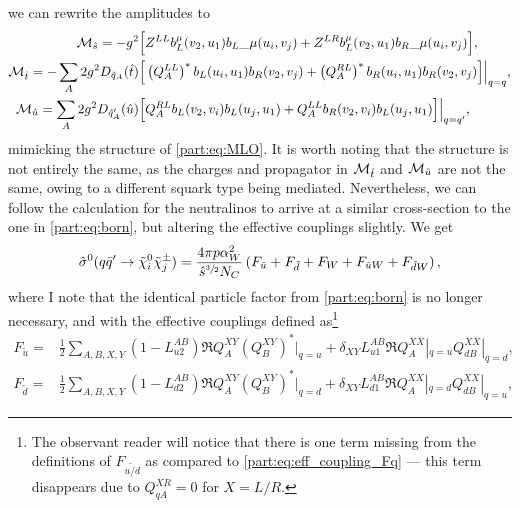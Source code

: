 \documentclass[../main.tex]{subfiles}
\begin{document}
we can rewrite the amplitudes to
\begin{subequations}
  \begin{align}
    \mathcal{M}_{\hat{s}} = -g^2 \Big[                                        &
      Z^{LL} b_L^\mu(v_2, u_1){b_L}\_{\mu}(u_i, v_j) + Z^{LR} b_L^\mu{(v_2, u_1)b_R}\_{\mu}(u_i, v_j)
    \Big],                                                             \\
    \mathcal{M}_{\hat{t}} = -\sum_A 2g^2 D_{\tilde{q}_A}(\hat{t}) \Big[       &
      \left(Q_{A}^{LL}\right)^\ast b_L(u_i, u_1) b_R(v_2, v_j) + \left(Q_{A}^{RL}\right)^\ast b_R(u_i, u_1) b_R(v_2, v_j)
    \Big] \Big|_{q=q},                                                 \\
    \mathcal{M}_{\hat{u}} = \sum_A 2g^2 D_{\tilde{q}^\prime_A}(\hat{u}) \Big[ &
      Q_{A}^{RL} b_L(v_2, v_i) b_L(u_j, u_1) + Q_{A}^{LL} b_R(v_2, v_i) b_L(u_j, u_1)
      \Big] \Big|_{q=q^\prime},
  \end{align}
\end{subequations}
mimicking the structure of \cref{part:eq:MLO}.
It is worth noting that the structure is not entirely the same, as the charges and propagator in \(\mathcal{M}_{\hat{t}}\) and \(\mathcal{M}_{\hat{u}}\) are not the same, owing to a different squark type being mediated.
Nevertheless, we can follow the calculation for the neutralinos to arrive at a similar cross-section to the one in \cref{part:eq:born}, but altering the effective couplings slightly.
We get
\begin{equation}
  \hat\sigma^0(q\bar{q}^\prime \to \tilde\chi^0_i \tilde\chi^\pm_j) = \frac{4 \pi p \alpha_W^2}{\hat{s}^{\sfrac{3}{2}} N_C} \left(F_{\tilde{u}} + F_{\tilde{d}} + F_W + F_{\tilde{u}W} + F_{\tilde{d}W}\right),
\end{equation}
where I note that the identical particle factor from \cref{part:eq:born} is no longer necessary, and with the effective couplings defined as\footnote{The observant reader will notice that there is one term missing from the definitions of \(F_{\tilde{u/d}}\) as compared to \cref{part:eq:eff_coupling_Fq} --- this term disappears due to \(Q_{qA}^{XR} = 0\) for \(X = L/R\).}
\\
\begin{subequations}
  \begin{align}
    F_{\tilde{u}} = & \frac{1}{2} \sum_{A,B,X,Y} (1 - L_{u2}^{AB}) \Re{Q_{A}^{XY} (Q_{B}^{XY})^\ast}\Big|_{q=u} + \delta_{XY} L_{u1}^{AB} \Re{Q_{A}^{XX}|_{q=u} Q_{dB}^{XX}|_{q=d}}, \\
    F_{\tilde{d}} = & \frac{1}{2} \sum_{A,B,X,Y} (1 - L_{d2}^{AB}) \Re{Q_{A}^{XY} (Q_{B}^{XY})^\ast}\Big|_{q=d} + \delta_{XY} L_{d1}^{AB} \Re{Q_{A}^{XX}|_{q=d} Q_{dB}^{XX}|_{q=u}},
  \end{align}
\end{subequations}
\end{document}
